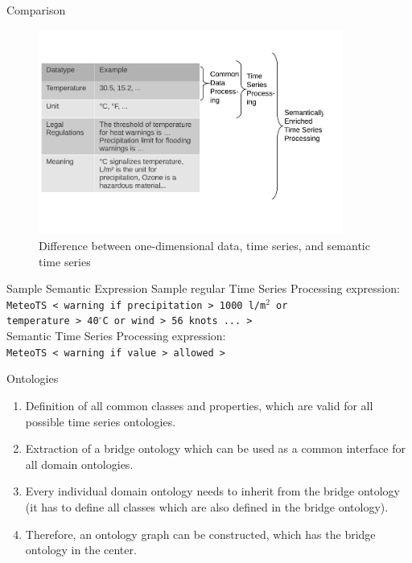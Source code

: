 \documentclass{beamer}
\begin{document}
\begin{frame}{Comparison}
\begin{figure}
\centering
\includegraphics[width=10cm]{semantic-ts-eps-converted-to}
\caption{Difference between one-dimensional data, time series, and semantic time series}
\end{figure}
\end{frame}

\begin{frame}{Sample Semantic Expression}
Sample regular Time Series Processing expression:\\                       
\texttt{MeteoTS < warning if precipitation > 1000 l/m$^2$ or}\\           
\texttt{temperature > 40$^\circ$C or wind > 56 knots ... >}\\             
\vspace{15pt}                                                             
Semantic Time Series Processing expression:\\                             
\texttt{MeteoTS < warning if value > allowed >} 
\end{frame}

\begin{frame}{Ontologies}
\begin{enumerate}
\item Definition of all common classes and properties, which are valid for all
possible time series ontologies.
\item Extraction of a bridge ontology which can be used as a common
interface for all domain ontologies.
\item Every individual domain ontology needs to inherit from the bridge
ontology (it has to define all classes which are also defined in the
bridge ontology).
\item Therefore, an ontology graph can be constructed, which has the
bridge ontology in the center.
\end{enumerate}
\end{frame}
\end{document}
